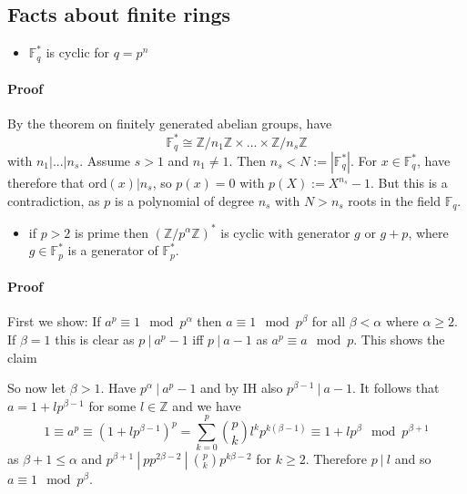 \documentclass{scrartcl}
\newcommand{\Z}{\mathbb{Z}}
\newcommand{\divides}{\ | \ }
\begin{document}
\subsection{Facts about finite rings}
\begin{itemize}
    \item $\mathbb{F}_q^*$ is cyclic for $q = p^n$
\end{itemize}
\paragraph{Proof} By the theorem on finitely generated abelian groups, have
\begin{equation}
    \mathbb{F}_q^* \cong \Z/n_1\Z \times ... \times \Z/n_s\Z \nonumber
\end{equation}
with $n_1 | ... | n_s$. Assume $s > 1$ and $n_1 \neq 1$. Then $n_s < N := |\mathbb{F}_q^*|$. For $x \in \mathbb{F}_q^*$, have therefore that $\mathrm{ord}(x) | n_s$, so $p(x) = 0$ with $p(X) := X^{n_s} - 1$. 
But this is a contradiction, as $p$ is a polynomial of degree $n_s$ with $N > n_s$ roots in the field $\mathbb{F}_q$.
\begin{itemize}
    \item if $p > 2$ is prime then $(\Z/p^\alpha\Z)^*$ is cyclic with generator $g$ or $g + p$, where $g \in \mathbb{F}_p^*$ is a generator of $\mathbb{F}_p^*$.
\end{itemize}
\paragraph{Proof} 
First we show: If $a^p \equiv 1 \mod p^\alpha$ then $a \equiv 1 \mod p^\beta$ for all $\beta < \alpha$ where $\alpha \geq 2$.
If $\beta = 1$ this is clear as $p \divides a^p - 1$ iff $p \divides a - 1$ as $a^p \equiv a \mod p$.
This shows the claim

So now let $\beta > 1$. Have $p^\alpha \divides a^p - 1$ and by IH also $p^{\beta - 1} \divides a - 1$.
It follows that $a = 1 + l p^{\beta - 1}$ for some $l \in \Z$ and we have
\begin{equation*}
    1 \equiv a^p \equiv (1 + l p^{\beta - 1})^p = \sum_{k = 0}^p \binom{p}{k} l^k p^{k(\beta - 1)} \equiv 1 + l p^{\beta} \mod p^{\beta + 1}
\end{equation*}
as $\beta + 1 \leq \alpha$ and $p^{\beta + 1} \divides p p^{2\beta - 2} \divides \binom{p}{k} p^{k\beta - 2}$ for $k \geq 2$.
Therefore $p \divides l$ and so $a \equiv 1 \mod p^{\beta}$.
\end{document}
